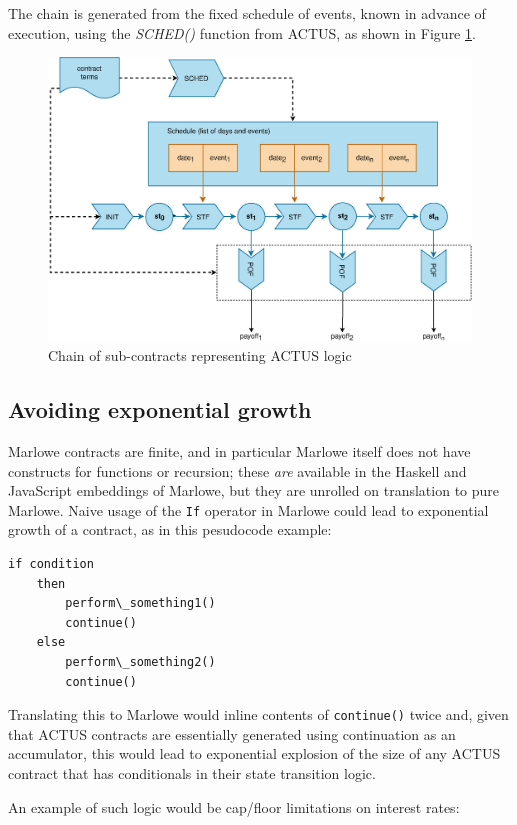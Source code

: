\documentclass[runningheads]{llncs}
\newcommand{\ident}[1]{\mbox{\emph{#1}}}
\begin{document}
The chain
is generated from the fixed schedule of events, known in advance of execution, 
using the \ident{SCHED()} function from ACTUS, as shown in Figure \ref{fig2}.

\begin{figure}
\includegraphics[width=1\textwidth]{images/flowchart} \caption{Chain of sub-contracts representing ACTUS logic}
\label{fig2} 
\end{figure}


\subsection{Avoiding exponential growth }

Marlowe contracts are finite, and in particular Marlowe itself does not have constructs for functions or recursion; these \emph{are} available in the Haskell and JavaScript embeddings of Marlowe, but they are unrolled on translation to pure Marlowe. Naive usage of the \texttt{If} operator in Marlowe could lead to exponential growth of a contract, as in this pesudocode example:

\begin{verbatim}
if condition 
	then 
		perform\_something1()
		continue() 
	else 
		perform\_something2() 
		continue()
\end{verbatim}
\noindent
Translating this to Marlowe would inline contents of \texttt{continue()} twice and, given that ACTUS
contracts are essentially generated using continuation as an accumulator,
this would lead to exponential explosion of the size of any ACTUS
contract that has conditionals in their state transition logic.

An example of such logic would be cap/floor limitations on interest rates:
\end{document}
